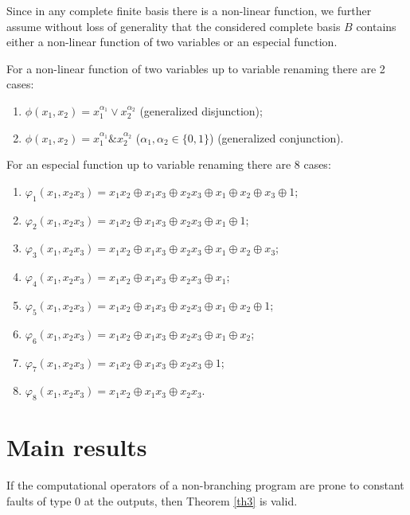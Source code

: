 \documentclass[
11pt,%
tightenlines,%
twoside,%
onecolumn,%
nofloats,%
nobibnotes,%
nofootinbib,%
superscriptaddress,%
noshowpacs,%
centertags]%
{revtex4}
\begin{document}
Since in any complete finite basis there is a non-linear function,
we further assume  without loss of generality that the considered
complete basis $B$ contains either a non-linear function of two
variables or an especial function.

For a non-linear function of two variables up to variable renaming there are 2 cases:
\begin{enumerate}
\item $\phi(x_1, x_2)=x_1^{\alpha_1}\vee x_2^{\alpha_2}$ (generalized disjunction);
\item $\phi(x_1, x_2)=x_1^{\alpha_1}\& x_2^{\alpha_2}$ ($\alpha_1, \alpha_2 \in \{0, 1\}$) (generalized conjunction).
\end{enumerate}

For an especial function up to variable renaming there are 8 cases:
\begin{enumerate}
\item  $\varphi_1(x_1, x_2 x_3)=x_1 x_2\oplus x_1 x_3 \oplus x_2 x_3 \oplus
x_1 \oplus x_2 \oplus x_3 \oplus 1$;
\item $\varphi_2(x_1, x_2 x_3)=x_1 x_2\oplus x_1 x_3 \oplus x_2 x_3 \oplus
x_1 \oplus 1$;
\item $\varphi_3(x_1, x_2 x_3)=x_1 x_2\oplus x_1 x_3 \oplus x_2 x_3 \oplus
x_1 \oplus x_2 \oplus x_3 $;
\item $\varphi_4(x_1, x_2 x_3)=x_1 x_2\oplus x_1 x_3 \oplus x_2 x_3 \oplus
x_1 $;
\item $\varphi_5(x_1, x_2 x_3)=x_1 x_2\oplus x_1 x_3 \oplus x_2 x_3 \oplus
x_1 \oplus x_2 \oplus 1$;
\item $\varphi_6(x_1, x_2 x_3)=x_1 x_2\oplus x_1 x_3 \oplus x_2 x_3 \oplus
x_1 \oplus x_2 $;
\item $\varphi_7(x_1, x_2 x_3)=x_1 x_2\oplus x_1 x_3 \oplus x_2 x_3
\oplus 1$;
\item $\varphi_8(x_1, x_2 x_3)=x_1 x_2\oplus x_1 x_3 \oplus x_2 x_3 $.
\end{enumerate}

\section{Main results}

If the computational operators of a non-branching program are prone to constant faults of type 0 at the outputs, then Theorem \ref{th3} is valid.
\end{document}
